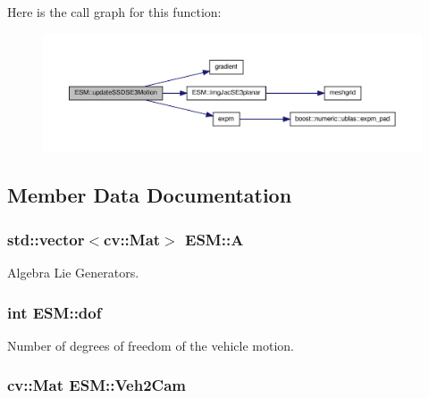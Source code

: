 \-Here is the call graph for this function\-:\nopagebreak
\begin{figure}[H]
\begin{center}
\leavevmode
\includegraphics[width=350pt]{classESM_a33e8bbd28952f91e13ebdf33bda0e7f9_cgraph}
\end{center}
\end{figure}




\subsection{\-Member \-Data \-Documentation}
\hypertarget{classESM_a3eb207d38c0dc5c0276b971d257d3351}{
\subsubsection[{\-A}]{\setlength{\rightskip}{0pt plus 5cm}std\-::vector$<$cv\-::\-Mat$>$ {\bf \-E\-S\-M\-::\-A}}}\label{classESM_a3eb207d38c0dc5c0276b971d257d3351}


\-Algebra \-Lie \-Generators. 

\hypertarget{classESM_a0a7316fa494eeefbbfcae555fe2fd890}{
\subsubsection[{dof}]{\setlength{\rightskip}{0pt plus 5cm}int {\bf \-E\-S\-M\-::dof}}}\label{classESM_a0a7316fa494eeefbbfcae555fe2fd890}


\-Number of degrees of freedom of the vehicle motion. 

\hypertarget{classESM_a49e6933a05d8baa8da4da4aedd87bbcc}{
\subsubsection[{\-Veh2\-Cam}]{\setlength{\rightskip}{0pt plus 5cm}cv\-::\-Mat {\bf \-E\-S\-M\-::\-Veh2\-Cam}}}\label{classESM_a49e6933a05d8baa8da4da4aedd87bbcc}


